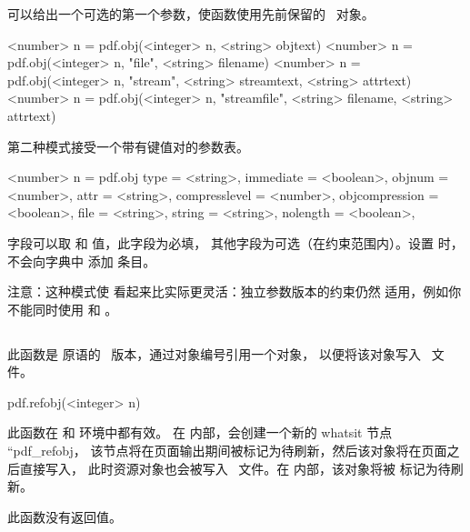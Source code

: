 可以给出一个可选的第一个参数，使函数使用先前保留的 \PDF\ 对象。

\begin{typing}
<number> n =
    pdf.obj(<integer> n, <string> objtext)
<number> n =
    pdf.obj(<integer> n, "file", <string> filename)
<number> n =
    pdf.obj(<integer> n, "stream", <string> streamtext, <string> attrtext)
<number> n =
    pdf.obj(<integer> n, "streamfile", <string> filename, <string> attrtext)
\end{typing}

第二种模式接受一个带有键值对的参数表。

\begin{typing}
<number> n = pdf.obj {
    type           = <string>,
    immediate      = <boolean>,
    objnum         = <number>,
    attr           = <string>,
    compresslevel  = <number>,
    objcompression = <boolean>,
    file           = <string>,
    string         = <string>,
    nolength       = <boolean>,
}
\end{typing}

 字段可以取  和  值，此字段为必填，
其他字段为可选（在约束范围内）。设置  时，不会向字典中
添加  条目。

注意：这种模式使  看起来比实际更灵活：独立参数版本的约束仍然
适用，例如你不能同时使用  和 。

\subsection{}



此函数是  原语的 \LUA\ 版本，通过对象编号引用一个对象，
以便将该对象写入 \PDF\ 文件。

\begin{typing}
pdf.refobj(<integer> n)
\end{typing}

此函数在  和  环境中都有效。
在  内部，会创建一个新的 whatsit 节点 ``pdf_refobj，
该节点将在页面输出期间被标记为待刷新，然后该对象将在页面之后直接写入，
此时资源对象也会被写入 \PDF\ 文件。在  内部，该对象将被
标记为待刷新。

此函数没有返回值。

\subsection{}

